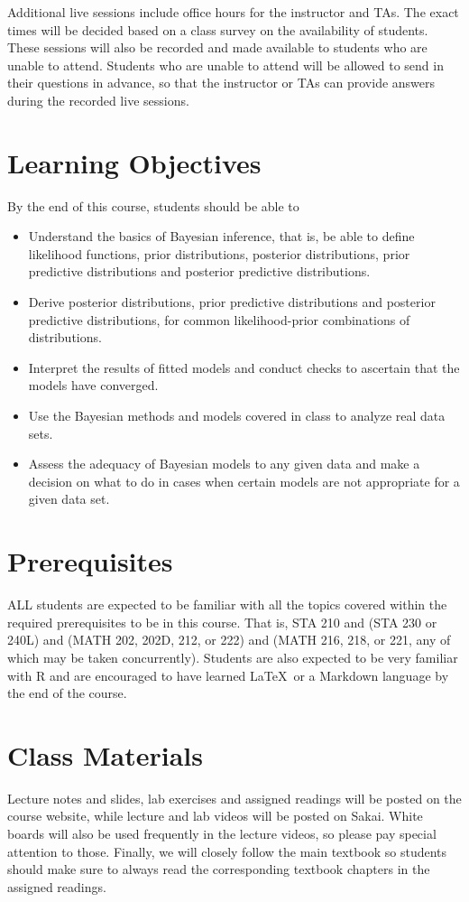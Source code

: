\documentclass[11pt, a4paper]{article}
\begin{document}
Additional live sessions include office hours for the instructor and TAs. The exact times will be decided based on a class survey on the availability of students. These sessions will also be recorded and made available to students who are unable to attend. Students who are unable to attend will be allowed to send in their questions in advance, so that the instructor or TAs can provide answers during the recorded live sessions.

\section{Learning Objectives}
By the end of this course, students should be able to
\begin{itemize}[label= {\color{darkblue}{\ArrowBoldRightStrobe}}]
	\item Understand the basics of Bayesian inference, that is, be able to define likelihood functions, prior distributions, posterior distributions, prior predictive distributions and posterior predictive distributions.
	\item Derive posterior distributions, prior predictive distributions and posterior predictive distributions, for common likelihood-prior combinations of distributions.
	\item Interpret the results of fitted models and conduct checks to ascertain that the models have converged.
	\item Use the Bayesian methods and models covered in class to analyze real data sets.
	\item Assess the adequacy of Bayesian models to any given data and make a decision on what to do in cases when certain models are not appropriate for a given data set.
\end{itemize}


\section{Prerequisites}
ALL students are expected to be familiar with all the topics covered within the required prerequisites to be in this course. That is, STA 210 and (STA 230 or 240L) and (MATH 202, 202D, 212, or 222) and (MATH 216, 218, or 221, any of which may be taken concurrently). Students are also expected to be very familiar with \textsf{R} and are encouraged to have learned \LaTeX \ or a Markdown language by the end of the course.


\section{Class Materials}
Lecture notes and slides, lab exercises and assigned readings will be posted on the course website, while lecture and lab videos will be posted on Sakai. White boards will also be used frequently in the lecture videos, so please pay special attention to those. Finally, we will closely follow the main textbook so students should make sure to always read the corresponding textbook chapters in the assigned readings.
\end{document}
